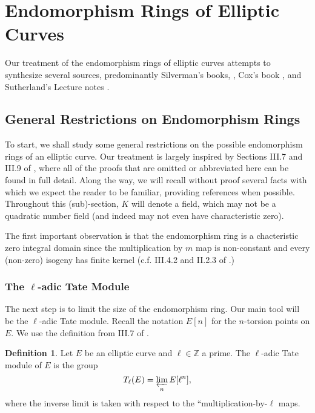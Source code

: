 \documentclass{amsart}
\theoremstyle{definition}
\newtheorem{definition}[thm]{Definition}
\theoremstyle{remark}
\numberwithin{equation}{section}
\newcommand{\bbZ}{\mathbb Z}
\begin{document}
\section{Endomorphism Rings of Elliptic Curves} \label{sec:EndRings}

Our treatment of the endomorphism rings of elliptic curves attempts to synthesize several sources, predominantly Silverman's books, \cite{SilvermanAEC, SilvermanATAEC}, Cox's book \cite{CoxPrimes}, and Sutherland's Lecture notes \cite{SutherlandLN}. 

\subsection{General Restrictions on Endomorphism Rings} \label{subsec:EndRingsInGeneral}

 To start, we shall study some general restrictions on the possible endomorphism rings of an elliptic curve. Our treatment is largely inspired by Sections III.7 and III.9 of \cite{SilvermanAEC}, where all of the proofs that are omitted or abbreviated here can be found in full detail. Along the way, we will recall without proof several facts with which we expect the reader to be familiar, providing references when possible. Throughout this (sub)-section, $K$ will denote a field, which may not be a quadratic number field (and indeed may not even have characteristic zero).
 
 The first important observation is that the endomorphism ring is a chacteristic zero integral domain since the multiplication by $m$ map is non-constant and every (non-zero) isogeny has finite kernel (c.f. III.4.2 and II.2.3 of \cite{SilvermanAEC}.)
 
 \subsubsection{The $\ell$-adic Tate Module}
 
 The next step is to limit the size of the endomorphism ring.
 Our main tool will be the $\ell$-adic Tate module. Recall the notation $E[n]$ for the $n$-torsion points on $E$. We use the definition from III.7 of \cite{SilvermanAEC}.
 
 \begin{definition}
 Let $E$ be an elliptic curve and $\ell \in \bbZ$ a prime. The $\ell$-adic Tate module of $E$ is the group 
 \[
 T_{\ell}(E) = \varprojlim_{n} E[\ell^{n}],
 \]
 where the inverse limit is taken with respect to the ``multiplication-by-$\ell$ maps.
 \end{definition}
 
\end{document}

